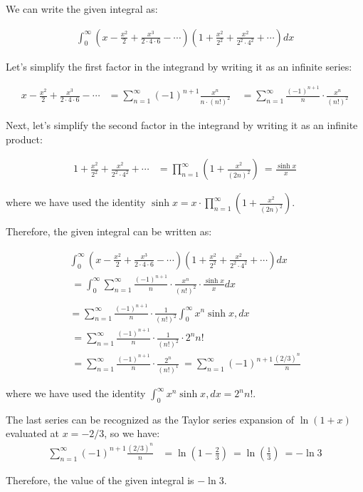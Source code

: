 \documentclass{article}
\begin{document}
We can write the given integral as:

\begin{align*}
\int_0^\infty \left(x-\frac{x^2}{2}+\frac{x^3}{2\cdot4\cdot6}-\cdots\right)\left(1+\frac{x^2}{2^2}+\frac{x^2}{2^2\cdot4^2}+\cdots\right) dx
\end{align*}

Let's simplify the first factor in the integrand by writing it as an infinite series:

\begin{align*}
x - \frac{x^2}{2} + \frac{x^3}{2\cdot4\cdot6} - \cdots &= \sum_{n=1}^\infty (-1)^{n+1} \frac{x^n}{n\cdot(n!)^2} \
&= \sum_{n=1}^\infty \frac{(-1)^{n+1}}{n} \cdot \frac{x^n}{(n!)^2}
\end{align*}

Next, let's simplify the second factor in the integrand by writing it as an infinite product:

\begin{align*}
1 + \frac{x^2}{2^2} + \frac{x^2}{2^2\cdot4^2} + \cdots &= \prod_{n=1}^\infty \left(1 + \frac{x^2}{(2n)^2}\right) \
= \frac{\sinh x}{x}
\end{align*}

where we have used the identity $\sinh x = x \cdot \prod_{n=1}^\infty \left(1 + \frac{x^2}{(2n)^2}\right)$.

Therefore, the given integral can be written as:

\begin{align*}
\int_0^\infty \left(x-\frac{x^2}{2}+\frac{x^3}{2\cdot4\cdot6}-\cdots\right)\left(1+\frac{x^2}{2^2}+\frac{x^2}{2^2\cdot4^2}+\cdots\right) dx\\\ = \int_0^\infty \sum_{n=1}^\infty \frac{(-1)^{n+1}}{n} \cdot \frac{x^n}{(n!)^2} \cdot \frac{\sinh x}{x} dx \\\\
= \sum_{n=1}^\infty \frac{(-1)^{n+1}}{n} \cdot \frac{1}{(n!)^2} \int_0^\infty x^n \sinh x , dx \\\
= \sum_{n=1}^\infty \frac{(-1)^{n+1}}{n} \cdot \frac{1}{(n!)^2} \cdot 2^n n! \\\
= \sum_{n=1}^\infty \frac{(-1)^{n+1}}{n} \cdot \frac{2^n}{(n!)^1} \
= \sum_{n=1}^\infty (-1)^{n+1} \frac{(2/3)^n}{n}
\end{align*}

where we have used the identity $\int_0^\infty x^n \sinh x , dx = 2^n n!$.

The last series can be recognized as the Taylor series expansion of $\ln(1+x)$ evaluated at $x=-2/3$, so we have:
\begin{align*}
\sum_{n=1}^\infty (-1)^{n+1} \frac{(2/3)^n}{n} &= \ln\left(1-\frac{2}{3}\right) \
= \ln\left(\frac{1}{3}\right) \
= -\ln 3
\end{align*}

Therefore, the value of the given integral is $-\ln 3$.
\end{document}
